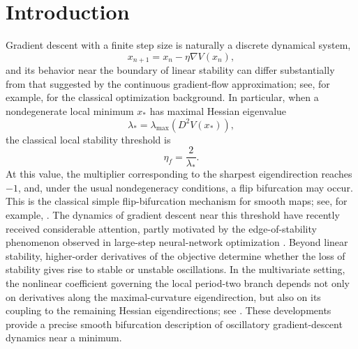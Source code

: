 \section{Introduction}
\label{sec:introduction}

Gradient descent with a finite step size is naturally a discrete
dynamical system,
\begin{equation}
x_{n+1}
=
x_n-\eta\nabla V(x_n),
\label{eq:intro-GD}
\end{equation}
and its behavior near the boundary of linear stability can differ
substantially from that suggested by the continuous gradient-flow
approximation; see, for example,
\cite{RobbinsMonro1951,Polyak1987,Nesterov2018,BottouCurtisNocedal2018}
for the classical optimization background.  In particular, when a nondegenerate local minimum
$x_*$ has maximal Hessian eigenvalue
\[
\lambda_*=
\lambda_{\max}(D^2V(x_*)),
\]
the classical local stability threshold is
\begin{equation}
\eta_f
=
\frac{2}{\lambda_*}.
\label{eq:intro-flip-threshold}
\end{equation}
At this value, the multiplier corresponding to the sharpest
eigendirection reaches $-1$, and, under the usual nondegeneracy
conditions, a flip bifurcation may occur.
This is the classical simple flip-bifurcation mechanism for smooth
maps; see, for example,
\cite{Kuznetsov2004,GuckenheimerHolmes1983,HaleKocak1991}.
The dynamics of gradient descent near this threshold have recently
received considerable attention, partly motivated by the
edge-of-stability phenomenon observed in large-step
neural-network optimization
\cite{CohenEtAl2021}.  Beyond
linear stability, higher-order derivatives of the objective determine
whether the loss of stability gives rise to stable or unstable
oscillations.  In the multivariate setting, the nonlinear coefficient
governing the local period-two branch depends not only on derivatives
along the maximal-curvature eigendirection, but also on its coupling to
the remaining Hessian eigendirections; see
\cite{MulayoffStich2026,Gan2026,Litman2026}.
These developments provide a
precise smooth bifurcation description of oscillatory gradient-descent
dynamics near a minimum.

